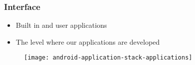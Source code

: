 %
%


\begin{frame}
  \frametitle{Interface}
  
  \begin{itemize}
  \item<1-> Built in and user applications
  \item<2-> The level where our applications are developed
  \end{itemize}

  \begin{figure}
    \centering
    \texttt{[image: android-application-stack-applications]}
  \end{figure}

\end{frame}


